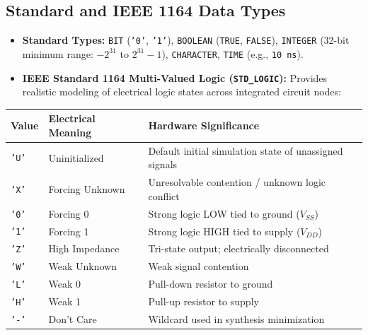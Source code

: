 \documentclass[12pt,a4paper]{article}
\begin{document}
\subsection{Standard and IEEE 1164 Data Types}
\begin{itemize}[leftmargin=*, itemsep=3pt]
  \item \textbf{Standard Types:} \texttt{BIT} (\texttt{'0'}, \texttt{'1'}), \texttt{BOOLEAN} (\texttt{TRUE}, \texttt{FALSE}), \texttt{INTEGER} (32-bit minimum range: $-2^{31}$ to $2^{31}-1$), \texttt{CHARACTER}, \texttt{TIME} (e.g., \texttt{10 ns}).
  \item \textbf{IEEE Standard 1164 Multi-Valued Logic (\texttt{STD\_LOGIC}):} Provides realistic modeling of electrical logic states across integrated circuit nodes:
\end{itemize}

\par\vspace{6pt}\noindent
\begingroup
\setlength{\tabcolsep}{3.5pt}
\setlength{\extrarowheight}{3pt}
\begin{tabularx}{\linewidth}{|B{1.6cm}|B{3.2cm}|Y|}
\hline
\textbf{Value} & \textbf{Electrical Meaning} & \textbf{Hardware Significance} \\
\hline
\texttt{'U'} & Uninitialized & Default initial simulation state of unassigned signals \\
\hline
\texttt{'X'} & Forcing Unknown & Unresolvable contention / unknown logic conflict \\
\hline
\texttt{'0'} & Forcing 0 & Strong logic LOW tied to ground ($V_{SS}$) \\
\hline
\texttt{'1'} & Forcing 1 & Strong logic HIGH tied to supply ($V_{DD}$) \\
\hline
\texttt{'Z'} & High Impedance & Tri-state output; electrically disconnected \\
\hline
\texttt{'W'} & Weak Unknown & Weak signal contention \\
\hline
\texttt{'L'} & Weak 0 & Pull-down resistor to ground \\
\hline
\texttt{'H'} & Weak 1 & Pull-up resistor to supply \\
\hline
\texttt{'-'} & Don't Care & Wildcard used in synthesis minimization \\
\hline
\end{tabularx}
\endgroup
\end{document}
